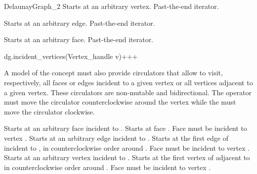 \begin{ccRefConcept}{DelaunayGraph_2}
{Starts at an arbitrary  vertex.}
\ccGlue
{}
{Past-the-end iterator.}

{Starts at an arbitrary edge.}
\ccGlue
{}
{Past-the-end iterator.}

{Starts at an arbitrary face.}
\ccGlue
{}
{Past-the-end iterator.}


{dg.incident_vertices(Vertex_handle v)+++}{}
\ccThreeToTwo



A model of the  concept must also provide
circulators that allow to visit, respectively, all faces or edges
incident to a given vertex or all vertices adjacent to a given
vertex. These circulators are non-mutable and bidirectional. The
operator  must move the circulator counterclockwise
around the vertex while the  must move the circulator
clockwise.

{Starts at an arbitrary face incident to .}
\ccGlue
{}
{Starts at face .
\ccPrecond Face  must be incident to vertex .}
{}
{Starts at an arbitrary edge incident to .}
\ccGlue
{}
{Starts at the first edge of  incident to , in
  counterclockwise order around .
\ccPrecond Face  must be incident to vertex .}
{}
{Starts at an arbitrary  vertex incident to .}
\ccGlue
{}
{Starts at the first vertex of  adjacent  to  in
  counterclockwise order around .
\ccPrecond Face  must be incident to vertex .}




\end{ccRefConcept}
